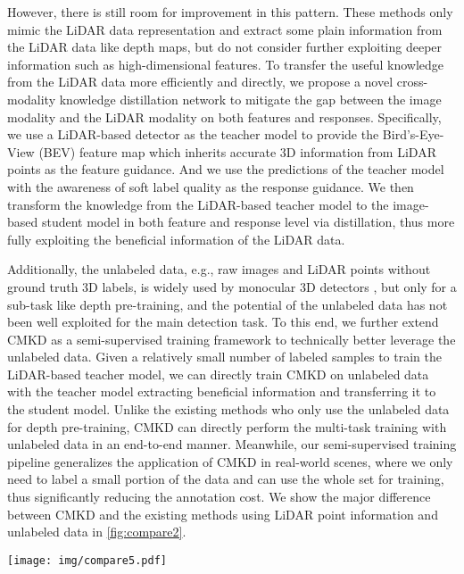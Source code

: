 \documentclass[runningheads]{llncs}
\begin{document}
However, there is still room for improvement in this pattern.
These methods only mimic the LiDAR data representation and extract some plain information from the LiDAR data like depth maps, but do not consider further exploiting deeper information such as high-dimensional features.
To transfer the useful knowledge from the LiDAR data more efficiently and directly, we propose a novel cross-modality knowledge distillation network to mitigate the gap between the image modality and the LiDAR modality on both features and responses.
Specifically, we use a LiDAR-based detector as the teacher model to provide the Bird’s-Eye-View (BEV) feature map which inherits accurate 3D information from LiDAR points as the feature guidance.
And we use the predictions of the teacher model with the awareness of soft label quality as the response guidance.
We then transform the knowledge from the LiDAR-based teacher model to the image-based student model in both feature and response level via distillation, thus more fully exploiting the beneficial information of the LiDAR data.

Additionally, the unlabeled data, e.g., raw images and LiDAR points without ground truth 3D labels, is widely used by monocular 3D detectors \cite{PL,DA-3d,AMOD,PL++,dd3d}, but only for a sub-task like depth pre-training, and the potential of the unlabeled data has not been well exploited for the main detection task.
To this end, we further extend CMKD as a semi-supervised training framework to technically better leverage the unlabeled data.
Given a relatively small number of labeled samples to train the LiDAR-based teacher model, we can directly train CMKD on unlabeled data with the teacher model extracting beneficial information and transferring it to the student model.
Unlike the existing methods who only use the unlabeled data for depth pre-training, CMKD can directly perform the multi-task training with unlabeled data in an end-to-end manner.
Meanwhile, our semi-supervised training pipeline generalizes the application of CMKD in real-world scenes, where we only need to label a small portion of the data and can use the whole set for training, thus significantly reducing the annotation cost. 
We show the major difference between CMKD and the existing methods using LiDAR point information and unlabeled data in \cref{fig:compare2}.

\begin{figure*}[t]
  \centering
   \texttt{[image: img/compare5.pdf]}
   \caption{Comparison between other methods and CMKD (Ours). 
   For the LiDAR points, CMKD performs knowledge distillation by extracting features and responses from them, not only the depth maps. 
   For the unlabeled data, CMKD can directly use it for multi-task training including feature learning and 3D detection, not only the depth pre-training sub-task.}
   \label{fig:compare2}
\end{figure*}
\end{document}
